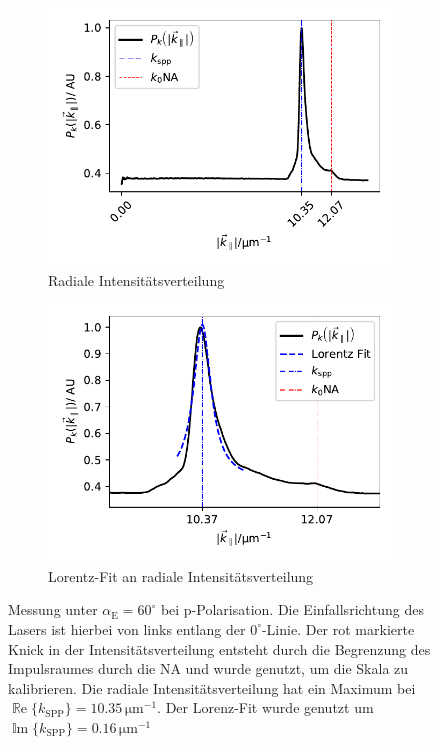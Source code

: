 \documentclass[titlepage,  ngerman]{article}
\renewcommand{\Re}{\operatorname{\mathbb{R}e}}
\renewcommand{\Im}{\operatorname{\mathbb{I}m}}
\begin{document}
\begin{figure}[h]
\begin{subfigure}{0.5\textwidth}
				\includegraphics[width=\textwidth]{figures/new/4_1_radial_int.pdf}
				\caption{Radiale Intensitätsverteilung}
				\label{fig:radial_profile}			
			\end{subfigure}
			\hfill
			\begin{subfigure}{0.49\textwidth}
				\centering
				\includegraphics[width=\textwidth]{figures/new/4_1_lorenz_profile.pdf}
				\caption{Lorentz-Fit an radiale Intensitätsverteilung}
				\label{fig:lorenz_profile}			
			\end{subfigure}
	
		\caption[Messwerte bei linearer Polarisation]{Messung unter $\alpha_{\mathrm{E}} = 60^\circ$ bei p-Polarisation. Die Einfallsrichtung des Lasers ist hierbei von links entlang der $0^\circ$-Linie. Der rot markierte Knick in der Intensitätsverteilung entsteht durch die Begrenzung des Impulsraumes durch die NA und wurde genutzt, um die Skala zu kalibrieren. Die radiale Intensitätsverteilung  hat ein Maximum bei $\Re\{k_{\mathrm{SPP}}\}= 10.35\,\mathrm{\mu m ^{-1}}$. Der Lorenz-Fit  wurde genutzt um $\Im\{k_{\mathrm{SPP}}\}= 0.16\,\mathrm{\mu m ^{-1}}$ }
		\label{fig:example_measure}			
	\end{figure}
\end{document}
